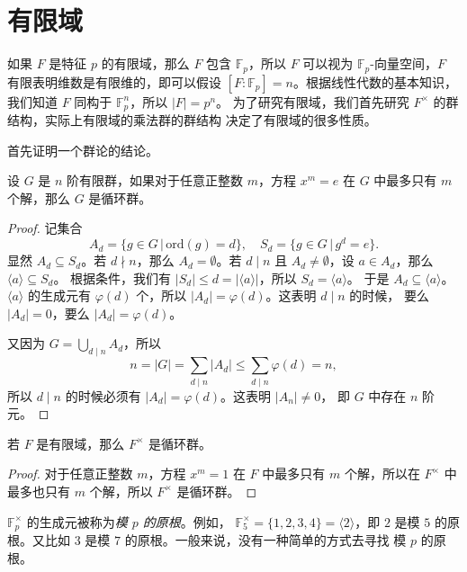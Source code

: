 
\section{有限域}

如果 $F$ 是特征 $p$ 的有限域，那么 $F$ 包含 $\mathbb{F}_p$，所以 $F$
可以视为 $\mathbb{F}_p$-向量空间，$F$ 有限表明维数是有限维的，即可以假设
$[F:\mathbb{F}_p]=n$。根据线性代数的基本知识，我们知道 $F$ 同构于
$\mathbb{F}_p^n$，所以 $|F|=p^n$。
为了研究有限域，我们首先研究 $F^\times$ 的群结构，实际上有限域的乘法群的群结构
决定了有限域的很多性质。

首先证明一个群论的结论。

\begin{lemma}
  设 $G$ 是 $n$ 阶有限群，如果对于任意正整数 $m$，方程 $x^m=e$ 在 $G$
  中最多只有 $m$ 个解，那么 $G$ 是循环群。
\end{lemma}
\begin{proof}
  记集合
  \[
    A_d=\{g\in G\,|\, \mathrm{ord}(g)=d\},\quad S_d=\{g\in G\,|\, g^d=e\}.
  \]
  显然 $A_d\subseteq S_d$。若 $d\nmid n$，那么 $A_d=\emptyset$。若 $d\mid n$
  且 $A_d\neq\emptyset$，设 $a\in A_d$，那么 $\langle a\rangle\subseteq S_d$。
  根据条件，我们有 $|S_d|\leq d=|\langle a\rangle|$，所以 $S_d=\langle a\rangle$。
  于是 $A_d\subseteq \langle a\rangle$。$\langle a\rangle$ 的生成元有
  $\varphi(d)$ 个，所以 $|A_d|=\varphi(d)$。这表明 $d\mid n$ 的时候，
  要么 $|A_d|=0$，要么 $|A_d|=\varphi(d)$。

  又因为 $G=\bigcup_{d\mid n}A_d$，所以
  \[
    n=|G|=\sum_{d\mid n}|A_d|\leq\sum_{d\mid n}\varphi(d)=n,
  \]
  所以 $d\mid n$ 的时候必须有 $|A_d|=\varphi(d)$。这表明 $|A_n|\neq 0$，
  即 $G$ 中存在 $n$ 阶元。
\end{proof}

\begin{corollary}
  若 $F$ 是有限域，那么 $F^\times $ 是循环群。
\end{corollary}
\begin{proof}
  对于任意正整数 $m$，方程 $x^m=1$ 在 $F$ 中最多只有 $m$ 个解，所以在
  $F^\times$ 中最多也只有 $m$ 个解，所以 $F^\times$ 是循环群。
\end{proof}

\begin{example}
  $\mathbb{F}_p^\times$ 的生成元被称为\emph{模 $p$ 的原根}。例如，
  $\mathbb{F}_5^\times=\{1,2,3,4\}=\langle 2\rangle$，即 $2$ 是模 $5$
  的原根。又比如 $3$ 是模 $7$ 的原根。一般来说，没有一种简单的方式去寻找
  模 $p$ 的原根。
\end{example}

